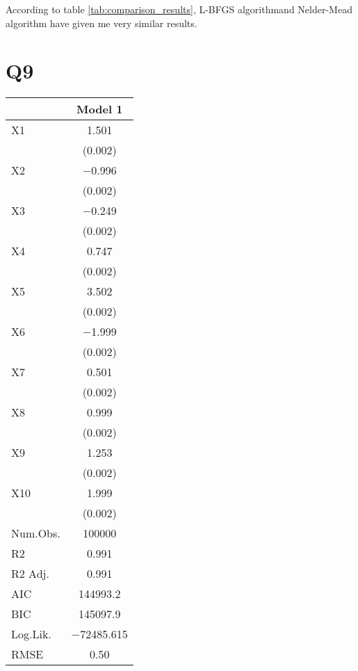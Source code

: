 \documentclass{article}
\begin{document}
According to table \ref{tab:comparison_results}, L-BFGS algorithmand Nelder-Mead
algorithm have given me very similar results.

\section*{Q9}

\begin{table}[h]
\centering
\begin{tabular}[t]{lc}
\hline
  & Model 1\\
\hline
X1 & \num{1.501}\\
 & \vphantom{9} (\num{0.002})\\
X2 & \num{-0.996}\\
 & \vphantom{8} (\num{0.002})\\
X3 & \num{-0.249}\\
 & \vphantom{7} (\num{0.002})\\
X4 & \num{0.747}\\
 & \vphantom{6} (\num{0.002})\\
X5 & \num{3.502}\\
 & \vphantom{5} (\num{0.002})\\
X6 & \num{-1.999}\\
 & \vphantom{4} (\num{0.002})\\
X7 & \num{0.501}\\
 & \vphantom{3} (\num{0.002})\\
X8 & \num{0.999}\\
 & \vphantom{2} (\num{0.002})\\
X9 & \num{1.253}\\
 & \vphantom{1} (\num{0.002})\\
X10 & \num{1.999}\\
 & (\num{0.002})\\
\hline
Num.Obs. & \num{100000}\\
R2 & \num{0.991}\\
R2 Adj. & \num{0.991}\\
AIC & \num{144993.2}\\
BIC & \num{145097.9}\\
Log.Lik. & \num{-72485.615}\\
RMSE & \num{0.50}\\
\hline
\end{tabular}
\end{table}
\end{document}
